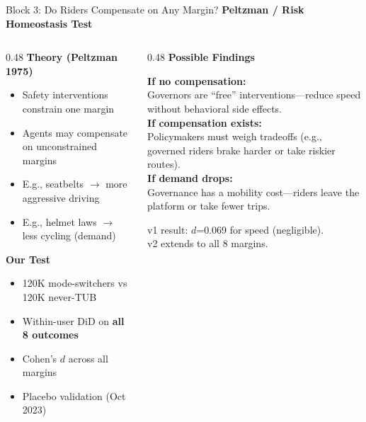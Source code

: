 \documentclass[aspectratio=169, 11pt]{beamer}
\begin{document}
\begin{frame}{Block 3: Do Riders Compensate on Any Margin?}
\textbf{\color{UMNMaroon}Peltzman / Risk Homeostasis Test}

\vspace{0.2cm}
\begin{columns}[T]
\begin{column}{0.48\textwidth}
\textbf{Theory (Peltzman 1975)}
\begin{itemize}
\item Safety interventions constrain one margin
\item Agents may compensate on unconstrained margins
\item E.g., seatbelts $\to$ more aggressive driving
\item E.g., helmet laws $\to$ less cycling (demand)
\end{itemize}

\vspace{0.15cm}
\textbf{Our Test}
\begin{itemize}
\item 120K mode-switchers vs 120K never-TUB
\item Within-user DiD on \textbf{all 8 outcomes}
\item Cohen's $d$ across all margins
\item Placebo validation (Oct 2023)
\end{itemize}
\end{column}
\begin{column}{0.48\textwidth}
\textbf{Possible Findings}
\vspace{0.1cm}

\textbf{\color{AccentGreen}If no compensation:}\\
Governors are ``free'' interventions---reduce speed without behavioral side effects.\\[6pt]

\textbf{\color{PhaseRed}If compensation exists:}\\
Policymakers must weigh tradeoffs (e.g., governed riders brake harder or take riskier routes).\\[6pt]

\textbf{\color{PhaseBlue}If demand drops:}\\
Governance has a mobility cost---riders leave the platform or take fewer trips.

\vspace{0.2cm}
{\footnotesize\color{gray} v1 result: $d$=0.069 for speed (negligible).\\v2 extends to all 8 margins.}
\end{column}
\end{columns}
\end{frame}
\end{document}
